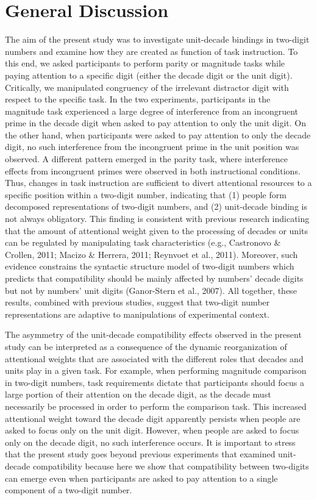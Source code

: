 \documentclass[english,man]{apa6}
\theoremstyle{definition}
\theoremstyle{definition}
\theoremstyle{definition}
\theoremstyle{remark}
\begin{document}
\section{General Discussion}\label{general-discussion}

The aim of the present study was to investigate unit-decade bindings in
two-digit numbers and examine how they are created as function of task
instruction. To this end, we asked participants to perform parity or
magnitude tasks while paying attention to a specific digit (either the
decade digit or the unit digit). Critically, we manipulated congruency
of the irrelevant distractor digit with respect to the specific task. In
the two experiments, participants in the magnitude task experienced a
large degree of interference from an incongruent prime in the decade
digit when asked to pay attention to only the unit digit. On the other
hand, when participants were asked to pay attention to only the decade
digit, no such interference from the incongruent prime in the unit
position was observed. A different pattern emerged in the parity task,
where interference effects from incongruent primes were observed in both
instructional conditions. Thus, changes in task instruction are
sufficient to divert attentional resources to a specific position within
a two-digit number, indicating that (1) people form decomposed
representations of two-digit numbers, and (2) unit-decade binding is not
always obligatory. This finding is consistent with previous research
indicating that the amount of attentional weight given to the processing
of decades or units can be regulated by manipulating task
characteristics (e.g., Castronovo \& Crollen, 2011; Macizo \& Herrera,
2011; Reynvoet et al., 2011). Moreover, such evidence constrains the
syntactic structure model of two-digit numbers which predicts that
compatibility should be mainly affected by numbers' decade digits but
not by numbers' unit digits (Ganor-Stern et al., 2007). All together,
these results, combined with previous studies, suggest that two-digit
number representations are adaptive to manipulations of experimental
context.

The asymmetry of the unit-decade compatibility effects observed in the
present study can be interpreted as a consequence of the dynamic
reorganization of attentional weights that are associated with the
different roles that decades and units play in a given task. For
example, when performing magnitude comparison in two-digit numbers, task
requirements dictate that participants should focus a large portion of
their attention on the decade digit, as the decade must necessarily be
processed in order to perform the comparison task. This increased
attentional weight toward the decade digit apparently persists when
people are asked to focus only on the unit digit. However, when people
are asked to focus only on the decade digit, no such interference
occurs. It is important to stress that the present study goes beyond
previous experiments that examined unit-decade compatibility because
here we show that compatibility between two-digits can emerge even when
participants are asked to pay attention to a single component of a
two-digit number.
\end{document}
